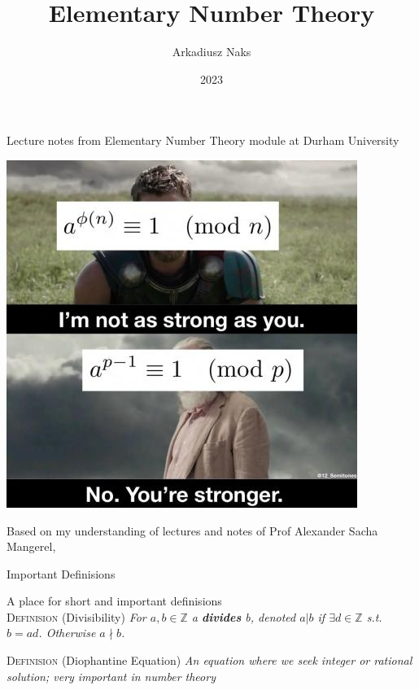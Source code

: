 \documentclass[12pt, letterpaper]{article}
\title{Elementary Number Theory}
\author{Arkadiusz Naks}
\date{2023}
\begin{document}
\begin{titlepage}
  \begin{center}
    \makeatletter
    \vspace*{1cm}
    \Huge
    \textbf{\@title}

    \vspace{0.5cm}
    \Large
    Lecture notes from Elementary Number Theory module at Durham University

    \vspace{1.5cm}

    \textbf{\@author}

    \includegraphics[scale=0.55]{ent.png}
    \vfill

    \vspace{0.8cm}

    \small
    Based on my understanding of lectures and notes of Prof Alexander Sacha Mangerel,
    \@date{}
  \end{center}
\end{titlepage}

\tableofcontents
\newpage

\begin{section}{Important Definisions}

  A place for short and important definisions \\

  \textsc{Definision} (Divisibility) \textit{For \(a, b \in \mathbb{Z}\) a
    \textbf{divides} b, denoted \(a | b\) if \(\exists d \in \mathbb{Z}\) s.t.
    \(b = ad\). Otherwise \(a \nmid b\).}

  \textsc{Definision} (Diophantine Equation) \textit{An equation where we seek
    integer or rational solution; very important in number theory}

\end{section}
\end{document}
